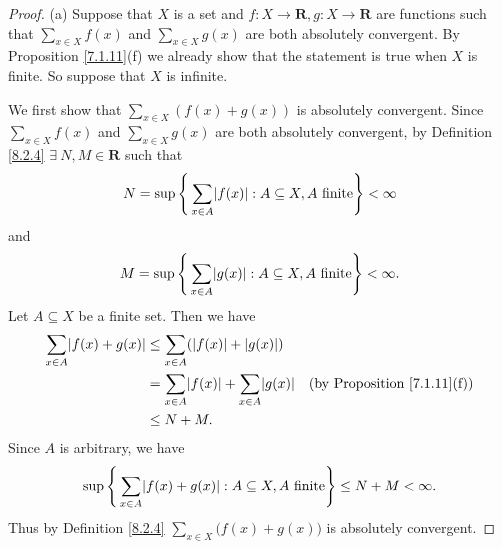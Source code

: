 \begin{proof}{(a)}
    Suppose that \(X\) is a set and \(f : X \to \mathbf{R}, g : X \to \mathbf{R}\) are functions such that \(\sum_{x \in X} f(x)\) and \(\sum_{x \in X} g(x)\) are both absolutely convergent.
    By Proposition \ref{7.1.11}(f) we already show that the statement is true when \(X\) is finite.
    So suppose that \(X\) is infinite.

    We first show that \(\sum_{x \in X} (f(x) + g(x))\) is absolutely convergent.
    Since \(\sum_{x \in X} f(x)\) and \(\sum_{x \in X} g(x)\) are both absolutely convergent, by Definition \ref{8.2.4} \(\exists\ N, M \in \mathbf{R}\) such that
    \[
        N = \sup\Bigg\{\sum_{x \in A} \abs*{f(x)} : A \subseteq X, A \text{ finite}\Bigg\} < \infty
    \]
    and
    \[
        M = \sup\Bigg\{\sum_{x \in A} \abs*{g(x)} : A \subseteq X, A \text{ finite}\Bigg\} < \infty.
    \]
    Let \(A \subseteq X\) be a finite set.
    Then we have
    \begin{align*}
        \sum_{x \in A} \abs*{f(x) + g(x)} & \leq \sum_{x \in A} (\abs*{f(x)} + \abs*{g(x)})                                                     \\
                                          & = \sum_{x \in A} \abs*{f(x)} + \sum_{x \in A} \abs*{g(x)} & \text{(by Proposition \ref{7.1.11}(f))} \\
                                          & \leq N + M.
    \end{align*}
    Since \(A\) is arbitrary, we have
    \[
        \sup\Bigg\{\sum_{x \in A} \abs*{f(x) + g(x)} : A \subseteq X, A \text{ finite}\Bigg\} \leq N + M < \infty.
    \]
    Thus by Definition \ref{8.2.4} \(\sum_{x \in X} \big(f(x) + g(x)\big)\) is absolutely convergent.


\end{proof}
